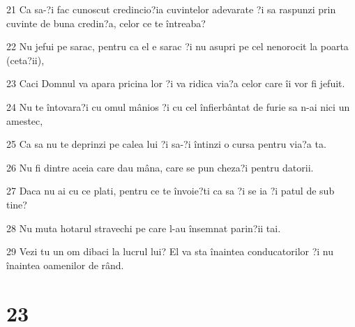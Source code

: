 \par 21 Ca sa-?i fac cunoscut credincio?ia cuvintelor adevarate ?i sa raspunzi prin cuvinte de buna credin?a, celor ce te întreaba?
\par 22 Nu jefui pe sarac, pentru ca el e sarac ?i nu asupri pe cel nenorocit la poarta (ceta?ii),
\par 23 Caci Domnul va apara pricina lor ?i va ridica via?a celor care îi vor fi jefuit.
\par 24 Nu te întovara?i cu omul mânios ?i cu cel înfierbântat de furie sa n-ai nici un amestec,
\par 25 Ca sa nu te deprinzi pe calea lui ?i sa-?i întinzi o cursa pentru via?a ta.
\par 26 Nu fi dintre aceia care dau mâna, care se pun cheza?i pentru datorii.
\par 27 Daca nu ai cu ce plati, pentru ce te învoie?ti ca sa ?i se ia ?i patul de sub tine?
\par 28 Nu muta hotarul stravechi pe care l-au însemnat parin?ii tai.
\par 29 Vezi tu un om dibaci la lucrul lui? El va sta înaintea conducatorilor ?i nu înaintea oamenilor de rând.

\chapter{23}

